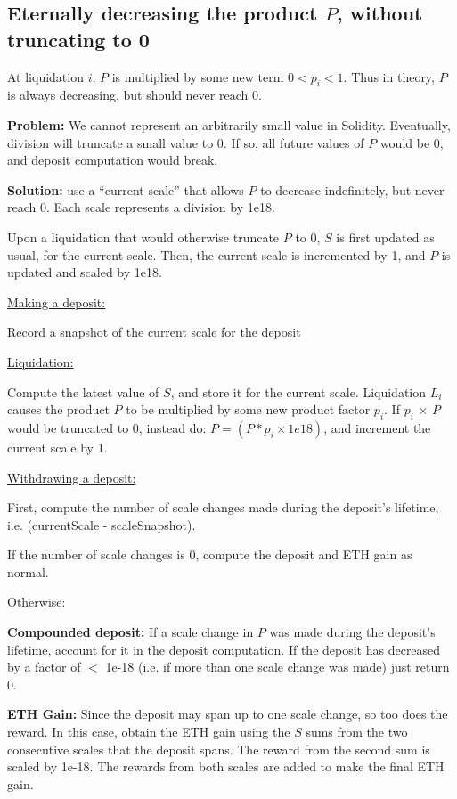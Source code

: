 \documentclass[reqno]{article}
\begin{document}
\bigskip
\subsection{Eternally decreasing the product $P$, without truncating to 0}

\bigskip
At liquidation $i$, $P$ is multiplied by some new term $0 < p_i <1$. Thus in theory, $P$ is always decreasing, but should never reach 0. 

\bigskip
\textbf{Problem:} We cannot represent an arbitrarily small value in Solidity.  Eventually, division will truncate a small value to 0. If so, all future values of $P$ would be 0, and deposit computation would break.

\bigskip
\textbf{Solution:} use a “current scale” that allows $P$ to decrease indefinitely, but never reach 0. Each scale represents a division by 1e18.  

\bigskip
Upon a liquidation that would otherwise truncate $P$ to 0, {$S$} is first updated as usual, for the current scale. Then, the current scale is incremented by 1, and {$P$} is updated and scaled by 1e18.

\bigskip
\underline{Making a deposit:}

Record a snapshot of the current scale for the deposit

\bigskip
\underline{Liquidation:}

Compute the latest value of {$S$}, and store it for the current scale.
Liquidation {$L_i$} causes the product {$P$} to be multiplied by some new product factor {$p_i$}.  If {$p_i$} $\times$ {$P$} would be truncated to 0, instead do: $P = (P * p_i \times 1e18)$, and increment the current scale by 1.

\bigskip
\underline{Withdrawing a deposit:}

First, compute the number of scale changes made during the deposit’s lifetime, i.e. (currentScale - scaleSnapshot).

\bigskip
If the number of scale changes is 0, compute the deposit and ETH gain as normal.

\bigskip
Otherwise:

\bigskip
\textbf{Compounded deposit:} If a scale change in {$P$} was made during the deposit's lifetime, account for it in the deposit computation. If the deposit has decreased by a factor of $<$ 1e-18 (i.e. if more than one scale change was made) just return 0.

\bigskip
\textbf{ETH Gain:} Since the deposit may span up to one scale change, so too does the reward. In this case, obtain the ETH gain using the {$S$} sums from the two consecutive scales that the deposit spans. The reward from the second sum is scaled by 1e-18. The rewards from both scales are added to make the final ETH gain.
\end{document}
